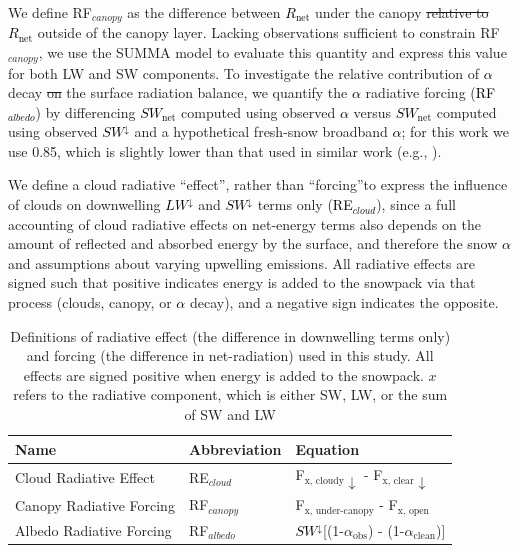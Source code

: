 \documentclass[draft]{agujournal2019}
\newcommand{\lwdn}{\textcolor{black}{$LW^{\downarrow}$}\xspace}
\newcommand{\rnet}{\textcolor{black}{$R_{\mathrm{net}}$}\xspace}
\newcommand{\swnet}{\textcolor{black}{$SW_{\mathrm{net}}$}\xspace}
\newcommand{\swdn}{\textcolor{black}{$SW^{\downarrow}$}\xspace}
\newcommand{\albedo}{\textcolor{black}{$\alpha$}\xspace}
\newcommand{\rfalb}{\textcolor{black}{RF$_{albedo}$}\xspace}
\newcommand{\rfcirrus}{\textcolor{black}{RE$_{cloud}$}\xspace}
\providecommand{\DIFadd}[1]{{\protect\color{blue}\uwave{#1}}} %
\providecommand{\DIFdel}[1]{{\protect\color{red}\sout{#1}}}                      %
\providecommand{\DIFaddbegin}{} %
\providecommand{\DIFaddend}{} %
\providecommand{\DIFdelbegin}{} %
\providecommand{\DIFdelend}{} %
\providecommand{\DIFaddFL}[1]{\DIFadd{#1}} %
\providecommand{\DIFaddbeginFL}{} %
\providecommand{\DIFaddendFL}{} %
\begin{document}
We define RF$_{canopy}$ as the difference between \rnet under the canopy \DIFdelbegin \DIFdel{relative to }\DIFdelend \DIFaddbegin \DIFadd{and }\DIFaddend \rnet outside of the canopy layer.
Lacking observations sufficient to constrain RF$_{canopy}$, we use the SUMMA model to evaluate this quantity and express this value for both LW and SW components.
To investigate the relative contribution of \albedo decay \DIFdelbegin \DIFdel{on }\DIFdelend \DIFaddbegin \DIFadd{to }\DIFaddend the surface radiation balance, we quantify the \albedo radiative forcing (\rfalb) by differencing \swnet computed using observed \albedo versus \swnet computed using observed \swdn and a hypothetical fresh-snow broadband \albedo; for this work we use 0.85, which is slightly lower than that used in similar work (e.g., ).

We define a cloud radiative ``effect'', rather than ``forcing''\DIFaddbegin \DIFadd{, }\DIFaddend to express the influence of clouds on downwelling \lwdn and \swdn terms only (\rfcirrus), since a full accounting of cloud radiative effects on net-energy terms also depends on the amount of reflected and absorbed energy by the surface, and therefore the snow \albedo \cite{Rudisill2025-cx} and assumptions about varying upwelling emissions.
All radiative effects are signed such that positive indicates energy is added to the snowpack via that process (clouds, canopy, or \albedo decay), and a negative sign indicates the opposite.

\begin{table}[h]
\centering
\caption{Definitions of radiative effect (the difference in downwelling terms only) and forcing (the difference in net-radiation) used in this study.
All effects are signed positive when energy is added to the snowpack.
$x$ refers to the radiative component, which is either SW, LW, or the sum of SW and LW\DIFaddbeginFL \DIFaddFL{.}\DIFaddendFL }
\label{tab:radiative_effects}
\begin{tabular}{lll}
\hline
\textbf{Name} & \textbf{Abbreviation} & \textbf{Equation} \\
\hline
Cloud Radiative Effect          & RE$_{cloud}$      & F$_\text{x, cloudy}\downarrow$  - F$_\text{x, clear}\downarrow$ \\
Canopy Radiative Forcing        & RF$_{canopy}$     & F$_\text{x, under-canopy}$     - F$_\text{x, open}$ \\
Albedo Radiative Forcing        & RF$_{albedo}$     & \swdn[(1-$\alpha_\text{obs}$)  - (1-$\alpha_\text{clean}$)]\\
\hline
\end{tabular}
\end{table}
\end{document}
